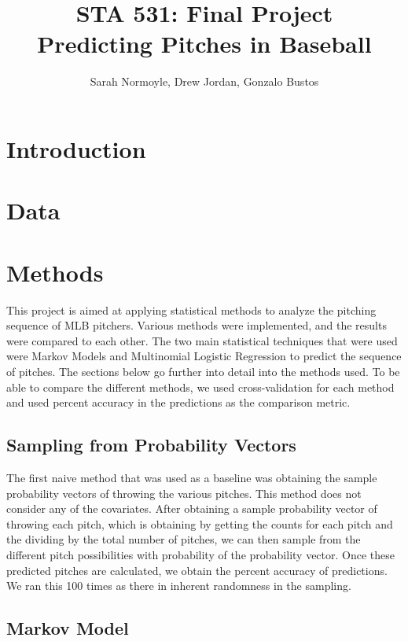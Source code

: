 \documentclass{article}
\begin{document}
\title{STA 531: Final Project \\ Predicting Pitches in Baseball}
\author{Sarah Normoyle, Drew Jordan, Gonzalo Bustos}

\maketitle 

\section{Introduction}

\section{Data}

\section{Methods}

This project is aimed at applying statistical methods to analyze the pitching sequence of MLB pitchers. Various methods were implemented, and the results were compared to each other. The two main statistical techniques that were used were Markov Models and Multinomial Logistic Regression to predict the sequence of pitches. The sections below go further into detail into the methods used. To be able to compare the different methods, we used cross-validation for each method and used percent accuracy in the predictions as the comparison metric.

\subsection{Sampling from Probability Vectors}

The first naive method that was used as a baseline was obtaining the sample probability vectors of throwing the various pitches. This method does not consider any of the covariates. After obtaining a sample probability vector of throwing each pitch, which is obtaining by getting the counts for each pitch and the dividing by the total number of pitches, we can then sample from the different pitch possibilities with probability of the probability vector. Once these predicted pitches are calculated, we obtain the percent accuracy of predictions. We ran this 100 times as there in inherent randomness in the sampling.

\subsection{Markov Model}
\end{document}
